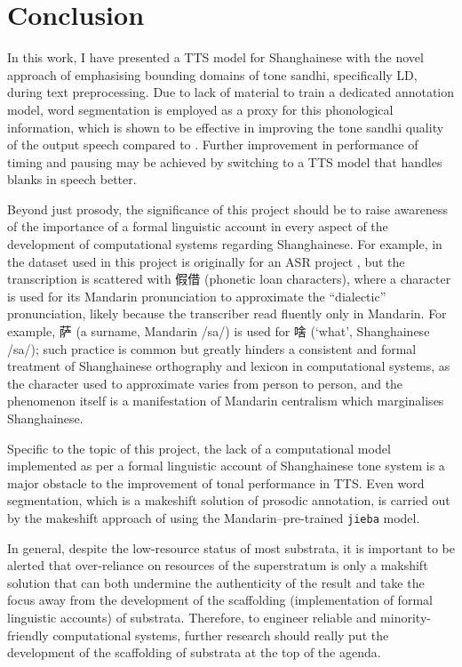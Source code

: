 \documentclass[11pt]{article}
\begin{document}
\section{Conclusion}
In this work, I have presented a TTS model for Shanghainese with the novel approach of emphasising bounding domains of tone sandhi, specifically LD, during text preprocessing. Due to lack of material to train a dedicated annotation model, word segmentation is employed as a proxy for this phonological information, which is shown to be effective in improving the tone sandhi quality of the output speech compared to \citet{VoiceOver}. Further improvement in performance of timing and pausing may be achieved by switching to a TTS model that handles blanks in speech better.

Beyond just prosody, the significance of this project should be to raise awareness of the importance of a formal linguistic account in every aspect of the development of computational systems regarding Shanghainese.
For example, in the dataset used in this project is originally for an ASR project \citep{cosmos-breakCosmosBreakAsr2023}, but the transcription is scattered with 假借 (phonetic loan characters), where a character is used for its Mandarin pronunciation to approximate the ``dialectic'' pronunciation, likely because the transcriber read fluently only in Mandarin. For example, 萨 (a surname, Mandarin /sa/) is used for 啥 (`what', Shanghainese /sa/); such practice is common but greatly hinders a consistent and formal treatment of Shanghainese orthography and lexicon in computational systems, as the character used to approximate varies from person to person, and the phenomenon itself is a manifestation of Mandarin centralism which marginalises Shanghainese.

Specific to the topic of this project, the lack of a computational model implemented as per a formal linguistic account of Shanghainese tone system is a major obstacle to the improvement of tonal performance in TTS. Even word segmentation, which is a makeshift solution of prosodic annotation, is carried out by the makeshift approach of using the Mandarin--pre-trained \texttt{jieba} model.

In general, despite the low-resource status of most substrata, it is important to be alerted that over-reliance on resources of the superstratum is only a makshift solution that can both undermine the authenticity of the result and take the focus away from the development of the scaffolding (implementation of formal linguistic accounts) of substrata.
Therefore, to engineer reliable and minority-friendly computational systems, further research should really put the development of the scaffolding of substrata at the top of the agenda.
\end{document}
